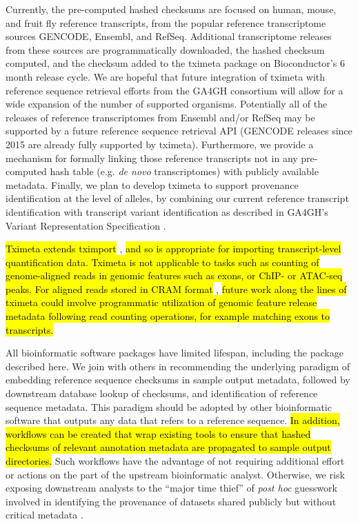 Currently, the pre-computed hashed checksums are focused on human,
mouse, and fruit fly reference transcripts, from the popular reference
transcriptome sources GENCODE, Ensembl, and RefSeq. Additional
transcriptome releases from these sources are programmatically
downloaded, the hashed checksum computed, and the checksum added to
the tximeta package on Bioconductor's 6 month release cycle. We are
hopeful that future integration of tximeta with reference sequence
retrieval efforts from the GA4GH consortium will allow for a wide
expansion of the number of supported organisms. Potentially all of the
releases of reference transcriptomes from Ensembl and/or RefSeq may be
supported by a future reference sequence retrieval API (GENCODE
releases since 2015 are already fully supported by
tximeta). Furthermore, we provide a mechanism for formally linking
those reference transcripts not in any pre-computed hash table
(e.g. \textit{de novo} transcriptomes) with publicly available
metadata. Finally, we plan to develop tximeta to support provenance
identification at the level of alleles, by combining our current
reference transcript identification with transcript variant
identification as described in GA4GH's Variant Representation
Specification \cite{vr}.

\hl{Tximeta extends tximport} \cite{tximport}, \hl{and so is
  appropriate for importing transcript-level quantification data.
  Tximeta is not applicable to tasks such as counting of
  genome-aligned reads in genomic features such as exons, or ChIP- or
  ATAC-seq peaks. For aligned reads stored in CRAM format} \cite{cram},
\hl{future work along the lines of tximeta could involve programmatic
  utilization of genomic feature release metadata following read
  counting operations, for example matching exons to transcripts.}

All bioinformatic software packages have limited lifespan, including
the package described here. We join with others in
recommending the underlying paradigm of embedding reference sequence
checksums in sample output metadata, followed by downstream database
lookup of checksums, and identification of reference sequence
metadata. This paradigm should be adopted by other bioinformatic
software that outputs any data that refers to a reference
sequence. \hl{In addition, workflows can be created that wrap existing
  tools to ensure that hashed checksums of relevant annotation
  metadata are propagated to sample output directories.}
Such workflows have the advantage of not requiring additional
effort or actions on the part of the upstream bioinformatic
analyst. Otherwise, we risk exposing downstream analysts
to the ``major time thief'' of \textit{post hoc} guesswork involved in
identifying the provenance of datasets shared publicly but without
critical metadata \cite{Kanduri2017}.

